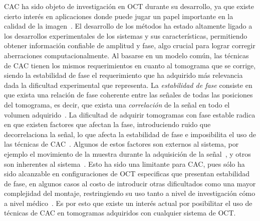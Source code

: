 \documentclass[letter, 12 pt]{article}
\begin{document}
CAC ha sido objeto de investigación en OCT durante su desarrollo, ya que existe cierto interés en aplicaciones donde puede jugar un papel importante en la calidad de la imagen~\cite{liu2017}. El desarrollo de los métodos ha estado altamente ligado a los desarrollos experimentales de los sistemas y sus características, permitiendo obtener información confiable de amplitud y fase, algo crucial para lograr corregir aberraciones computacionalmente. Al basarse en un modelo común, las técnicas de CAC tienen los mismos requerimientos en cuanto al tomograma que se corrige, siendo la estabilidad de fase el requerimiento que ha adquirido más relevancia dada la dificultad experimental que representa. La \textit{estabilidad de fase} consiste en que exista una relación de fase coherente entre las señales de todas las posiciones del tomograma, es decir, que exista una \textit{correlación} de la señal en todo el volumen adquirido~\cite{Shemonski2014_Stability}. La dificultad de adquirir tomogramas con fase estable radica en que existen factores que afectan la fase, introduciendo ruido que decorrelaciona la señal, lo que afecta la estabilidad de fase e imposibilita el uso de las técnicas de CAC~\cite{Shemonski2014_Stability}. Algunos de estos factores son externos al sistema, por ejemplo el movimiento de la muestra durante la adquisición de la señal~\cite{shemonskiStabilityComputedOptical2014}, y otros son inherentes al sistema~\cite{Vakoc2005_Phase}. Esto ha sido una limitante para CAC, pues sólo ha sido alcanzable en configuraciones de OCT especificas que presentan estabilidad de fase, en algunos casos al costo de introducir otras dificultados como una mayor complejidad del montaje, restringiendo su uso tanto a nivel de investigación cómo a nivel médico~\cite{Shemonski2014_Stability, liu2017}. Es por esto que existe un interés actual por posibilitar el uso de técnicas de CAC en tomogramas adquiridos con cualquier sistema de OCT. \\

\end{document}

